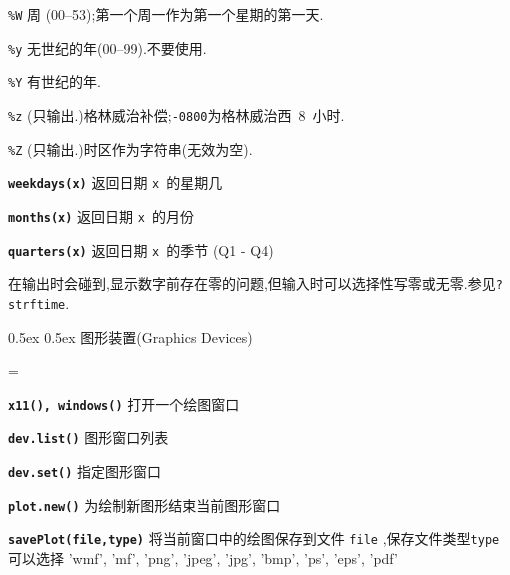\documentclass[landscape]{article}
\makeatletter
\renewcommand\section{\@startsection{section}{1}{0mm}%
                                     {0.5ex}%
                                     {0.5ex}%
                                {\color{black}\normalfont\large\bfseries}}
\newcommand{\code}{\texttt}
\newcommand{\bcode}[1]{\texttt{\textbf{#1}}}
\makeatother
\begin{document}
\begin{multicols*}{3}
{    %
    \item{\code{\%W}} {周   (00--53);第一个周一作为第一个星期的第一天.}
    \item{\code{\%y}} {无世纪的年(00--99).不要使用.}
    \item{\code{\%Y}} {有世纪的年.}
    \item{\code{\%z}} {(只输出.)格林威治补偿;\code{-0800}为格林威治西~8~小时.}
    \item{\code{\%Z}} {(只输出.)时区作为字符串(无效为空).}
  }
\bcode{weekdays(x)} 返回日期 \code{x}~的星期几

\bcode{months(x)}   返回日期 \code{x}~的月份

\bcode{quarters(x)} 返回日期 \code{x}~的季节 (Q1 - Q4)

在输出时会碰到,显示数字前存在零的问题,但输入时可以选择性写零或无零.参见\code{?strftime}.

\section{图形装置(Graphics Devices)}

\everypar={\hangindent=9mm}

\bcode{x11(), windows()}  打开一个绘图窗口

\bcode{dev.list()}    图形窗口列表

\bcode{dev.set()} 指定图形窗口

\bcode{plot.new()}  为绘制新图形结束当前图形窗口

\bcode{savePlot(file,type)}  将当前窗口中的绘图保存到文件 \code{file} ,保存文件类型\code{type} 可以选择
'wmf', 'mf', 'png', 'jpeg', 'jpg', 'bmp', 'ps', 'eps', 'pdf'


\end{multicols*}
\end{document}
